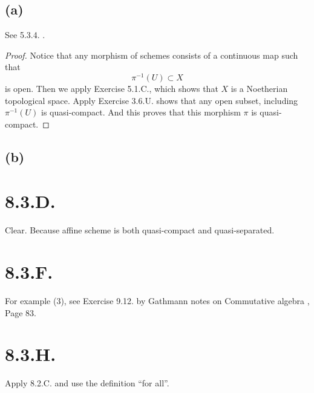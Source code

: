 \subsection{(a)}
	See 5.3.4. \cite{RaviRisingSea}.
\begin{proof}
	Notice that any morphism of schemes consists of a continuous map such that 
	\[\pi^{-1}(U)\subset X\]
	is open. Then we apply Exercise 5.1.C., which shows that $X$ is a Noetherian topological space. Apply Exercise 3.6.U. shows that any open subset, including $\pi^{-1}(U)$ is quasi-compact. And this proves that this morphism $\pi$ is quasi-compact.
\end{proof}

\subsection{(b)}


\section{8.3.D.}

Clear. Because affine scheme is both quasi-compact and quasi-separated.

\section{8.3.F.}

For example (3), see Exercise 9.12. by Gathmann notes on Commutative algebra \cite{GathNotes}, Page 83.

\section{8.3.H.}

Apply 8.2.C. and use the definition \enquote{for all}.